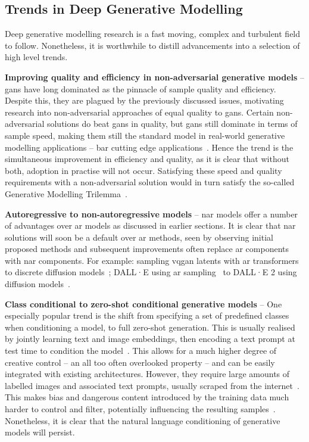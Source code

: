 \subsection{Trends in Deep Generative Modelling}
\label{subsec:trends}

Deep generative modelling research is a fast moving, complex and turbulent field
to follow. Nonetheless, it is worthwhile to distill advancements into a
selection of high level trends.

\textbf{Improving quality and efficiency in non-adversarial generative models} -- 
\glspl{gan} have long dominated as the pinnacle of sample quality and
efficiency. Despite this, they are plagued by the previously discussed issues,
motivating research into non-adversarial approaches of equal quality to
\glspl{gan}. Certain non-adversarial solutions do beat \glspl{gan} in quality,
but \glspl{gan} still dominate in terms of sample speed, making them still the
standard model in real-world generative modelling applications -- bar cutting
edge applications~\cite{ramesh2021dalle,ramesh2022dalle2}. Hence the trend is
the simultaneous improvement in efficiency and quality, as it is clear that
without both, adoption in practise will not occur. Satisfying these speed and
quality requirements with a non-adversarial solution would in turn satisfy the
so-called Generative Modelling Trilemma~\cite{xiao2021trilemma}.

\textbf{Autoregressive to non-autoregressive models} -- 
\Gls{nar} models offer a number of advantages over \gls{ar} models as discussed
in earlier sections. It is clear that \gls{nar} solutions will soon be a default
over \gls{ar} methods, seen by observing initial proposed methods and
subsequent improvements often replace \gls{ar} components with \gls{nar}
components. For example: sampling \gls{vqgan} latents with \gls{ar}
transformers~\cite{esser2021taming} to discrete diffusion
models~\cite{bondtaylor2021unleashing}; DALL·E using \gls{ar}
sampling~\cite{ramesh2021dalle} to DALL·E 2 using diffusion
models~\cite{ramesh2022dalle2}.

\textbf{Class conditional to zero-shot conditional generative models} -- 
One especially popular trend is the shift from specifying a set of predefined
classes when conditioning a model, to full zero-shot generation. This is usually
realised by jointly learning text and image embeddings, then encoding a text
prompt at test time to condition the
model~\cite{ramesh2021dalle,ramesh2022dalle2,rombach2021highresolution,lee2022rqvae}.
This allows for a much higher degree of creative control -- an all too often
overlooked property -- and can be easily integrated with existing architectures.
However, they require large amounts of labelled images and associated text
prompts, usually scraped from the
internet~\cite{rombach2021highresolution,ramesh2021dalle,ramesh2022dalle2}. This
makes bias and dangerous content introduced by the training data much harder to
control and filter, potentially influencing the resulting
samples~\cite{mishkin2022risks}. Nonetheless, it is clear that the natural
language conditioning of generative models will persist.

